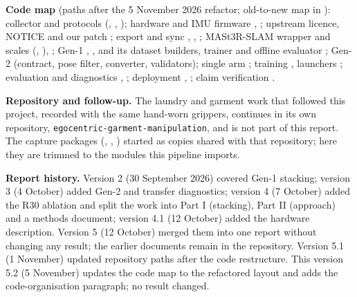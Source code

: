 \documentclass[conference,10pt]{IEEEtran}
\begin{document}
\textbf{Code map} (paths after the 5 November 2026 refactor; old-to-new map in ): collector and
protocols  (, , );
hardware and IMU firmware , ; upstream licence, NOTICE and our patch ; export and
sync , , ; MASt3R-SLAM wrapper and scales
 (, ), ; Gen-1
, , and its dataset builders, trainer and offline evaluator
; Gen-2  (contract, pose filter, converter, validators); single arm
; training , launchers ; evaluation and diagnostics
, ; deployment , ; claim verification
.

\textbf{Repository and follow-up.} The laundry and garment work that followed this project, recorded with the same hand-worn
grippers, continues in its own repository, \texttt{egocentric-garment-manipulation}, and is not part of this report. The capture
packages (, , ) started as copies shared with that repository; here they are
trimmed to the modules this pipeline imports.

\textbf{Report history.} Version 2 (30 September 2026) covered Gen-1 stacking; version 3 (4 October) added Gen-2 and transfer
diagnostics; version 4 (7 October) added the R30 ablation and split the work into Part I (stacking), Part II (approach) and a
methods document; version 4.1 (12 October) added the hardware description. Version 5 (12 October) merged them into one report without
changing any result; the earlier documents remain in the repository. Version 5.1 (1 November) updated repository paths after
the code restructure. This version 5.2 (5 November) updates the code map to the refactored layout and adds the code-organisation
paragraph; no result changed.
\end{document}
